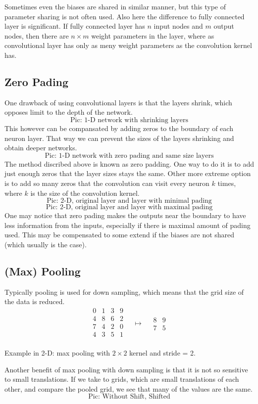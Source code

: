 \documentclass[]{article}
\begin{document}
Sometimes even the biases are shared in similar manner, but this type of
parameter sharing is not often used. Also here the difference to fully connected
layer is significant. If fully connected layer has $n$ input nodes and $m$ output
nodes, then there are $n \times m$ weight parameters in the layer, where as
convolutional layer has only as meny weight parameters as the convolution kernel
has.

\subsection{Zero Pading}
One drawback of using convolutional layers is that the layers shrink, which
opposes limit to the depth of the network.
\[
\text{Pic: 1-D network with shrinking layers}
\]
This however can be compansated by
adding zeros to the boundary of each neuron layer. That way we can prevent the
sizes of the layers shrinking and obtain deeper networks.
\[
\text{Pic: 1-D network with zero pading and same size layers}
\]
The method discribed above is known as zero padding. One way to do it is to add
just enough zeros that the layer sizes stays the same. Other more extreme option
is to add so many zeros that the convolution can visit every neuron $k$ times,
where $k$ is the size of the convolution kernel.
\[
\text{Pic: 2-D, original layer and layer with minimal pading}
\]
\[
\text{Pic: 2-D, original layer and layer with maximal pading}
\]
One may notice that zero pading makes the outputs near the boundary to have less
information from the inputs, especially if there is maximal amount of pading
used. This may be compensated to some extend if the biases are not shared (which
usually is the case).

\subsection{(Max) Pooling}
Typically pooling is used for down sampling, which means that the grid size of
the data is reduced.
\[
\begin{array}{c|c|c|c}
  0 & 1 & 3 & 9\\
  \hline
  4 & 8 & 6 & 2\\
  \hline
  7 & 4 & 2 & 0\\
  \hline
  4 & 3 & 5 & 1\\
 \end{array}
 \quad \mapsto \quad
 \begin{array}{c|c}
   8 & 9\\
   \hline
   7 & 5
  \end{array}
 \]
\begin{center}Example in 2-D: max pooling with $2\times2$ kernel and stride = 2.\end{center}
Another benefit of max pooling with down sampling is that it is not so sensitive
to small translations. If we take to grids, which are small translations of each
other, and compare the pooled grid, we see that many of the values are the same.
\[
\text{Pic: Without Shift, Shifted}
\]
\end{document}
